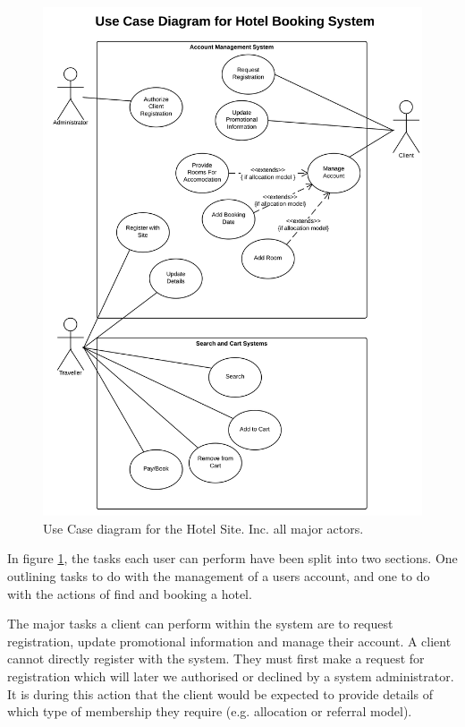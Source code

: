 \documentclass{article}
\begin{document}
\begin{figure}[H]
\centering
\includegraphics[width=1\textwidth]{img/UseCase.png}
\caption{Use Case diagram for the Hotel Site. Inc. all major actors.}
\label{fig:use-case}
\end{figure}

In figure \ref{fig:use-case}, the tasks each user can perform have been split into two sections. One outlining tasks to do with the management of a users account, and one to do with the actions of find and booking a hotel.

The major tasks a client can perform within the system are to request registration, update promotional information and manage their account. A client cannot directly register with the system. They must first make a request for registration which will later we authorised or declined by a system administrator. It is during this action that the client would be expected to provide details of which type of membership they require (e.g. allocation or referral model).
\end{document}
